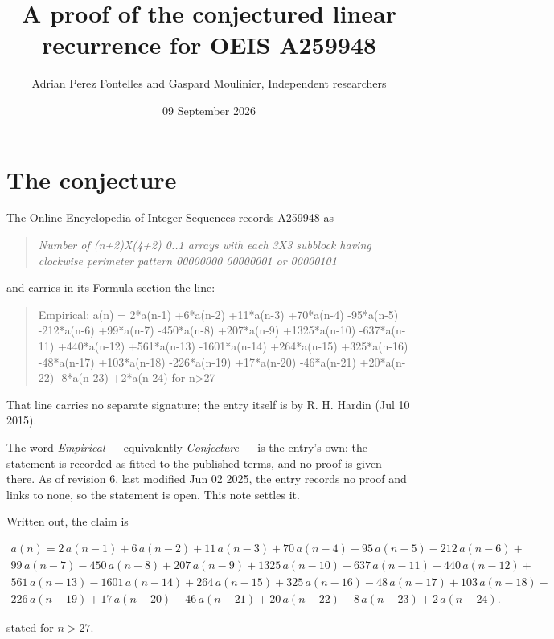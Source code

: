 \documentclass[11pt]{article}
\title{A proof of the conjectured linear recurrence for OEIS A259948}
\author{Adrian Perez Fontelles and Gaspard Moulinier, Independent researchers}
\date{09 September 2026}
\theoremstyle{definition}
\begin{document}
\maketitle
\section{The conjecture}

The Online Encyclopedia of Integer Sequences records \href{https://oeis.org/A259948}{A259948} as

\begin{quote}\itshape Number of (n+2)X(4+2) 0..1 arrays with each 3X3 subblock having clockwise perimeter pattern 00000000 00000001 or 00000101\end{quote}

and carries in its Formula section the line:

\begin{quote}\ttfamily Empirical: a(n) = 2*a(n-1) +6*a(n-2) +11*a(n-3) +70*a(n-4) -95*a(n-5) -212*a(n-6) +99*a(n-7) -450*a(n-8) +207*a(n-9) +1325*a(n-10) -637*a(n-11) +440*a(n-12) +561*a(n-13) -1601*a(n-14) +264*a(n-15) +325*a(n-16) -48*a(n-17) +103*a(n-18) -226*a(n-19) +17*a(n-20) -46*a(n-21) +20*a(n-22) -8*a(n-23) +2*a(n-24) for n>27\end{quote}

That line carries no separate signature; the entry itself is by R. H. Hardin (Jul 10 2015).

The word {\itshape Empirical} --- equivalently {\itshape Conjecture} --- is the entry's own: the statement is recorded as fitted to the published terms, and no proof is given there. As of revision 6, last modified Jun 02 2025, the entry records no proof and links to none, so the statement is open. This note settles it.

Written out, the claim is

\begin{multline*} a(n) = 2\,a(n-1) + 6\,a(n-2) + 11\,a(n-3) + 70\,a(n-4) - 95\,a(n-5) - 212\,a(n-6) + \\ 99\,a(n-7) - 450\,a(n-8) + 207\,a(n-9) + 1325\,a(n-10) - 637\,a(n-11) + 440\,a(n-12) + \\ 561\,a(n-13) - 1601\,a(n-14) + 264\,a(n-15) + 325\,a(n-16) - 48\,a(n-17) + 103\,a(n-18) - \\ 226\,a(n-19) + 17\,a(n-20) - 46\,a(n-21) + 20\,a(n-22) - 8\,a(n-23) + 2\,a(n-24). \end{multline*}

stated for $n > 27$.
\end{document}
